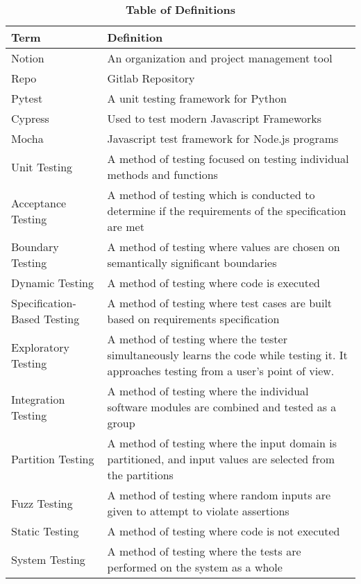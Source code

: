 \documentclass[12pt, titlepage]{article}
\begin{document}
\begin{table}[!htbp]
\caption{\textbf{Table of Definitions}} \label{Table}

\begin{tabularx}{\textwidth}{p{3cm}X}
\toprule
\textbf{Term} & \textbf{Definition}\\
\midrule
Notion & An organization and project management tool\\
\midrule
Repo & Gitlab Repository\\
\midrule
Pytest & A unit testing framework for Python \\
\midrule
Cypress & Used to test modern Javascript Frameworks \\
\midrule
Mocha & Javascript test framework for Node.js programs \\
\midrule
Unit Testing & A method of testing focused on testing individual methods and functions\\
\midrule
Acceptance Testing & A method of testing which is conducted to determine if the requirements of the specification are met \\
\midrule
Boundary Testing & A method of testing where values are chosen on semantically significant boundaries  \\
\midrule
Dynamic Testing & A method of testing where code is executed  \\
\midrule
Specification-Based Testing & A method of testing where test cases are built based on requirements specification \\
\midrule
Exploratory Testing & A method of testing where the tester simultaneously learns the code while testing it. It approaches testing from a user’s point of view.  \\
\midrule
Integration Testing & A method of testing where the individual software modules are combined and tested as a group  \\
\midrule
Partition Testing & A method of testing where the input domain is partitioned, and input values are selected from the partitions \\
\midrule
Fuzz Testing & A method of testing where random inputs are given to attempt to violate assertions  \\
\midrule
Static Testing & A method of testing where code is not executed  \\
\midrule
System Testing & A method of testing where the tests are performed on the system as a whole \\
\bottomrule
\end{tabularx}

\end{table}	
\end{document}
